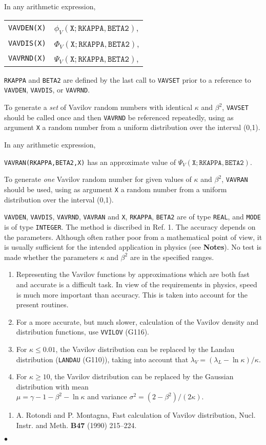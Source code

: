 In any arithmetic expression,
\begin{center}
\begin{tabular}{r@{\qquad has an approximate value of \qquad}l}
{\tt VAVDEN(X)} & $\phi_V(\mathtt{X;RKAPPA,BETA2})$, \\
{\tt VAVDIS(X)} & $\Phi_V(\mathtt{X;RKAPPA,BETA2})$, \\
{\tt VAVRND(X)} & $\Psi_V(\mathtt{X;RKAPPA,BETA2})$,
\end{tabular} \end{center}
\par
{\tt RKAPPA} and {\tt BETA2} are defined by the last call to
{\tt VAVSET} prior to a reference to {\tt VAVDEN}, {\tt VAVDIS}, or
{\tt VAVRND}.
\par
To generate a {\it set} of Vavilov random numbers with identical $\kappa$
and $\beta^2$, {\tt VAVSET} should be called once and then {\tt VAVRND}
be referenced repeatedly, using as argument {\tt X} a random number
from a uniform distribution over the interval (0,1).
\par
In any arithmetic expression,
\begin{center}
{\tt VAVRAN(RKAPPA,BETA2,X)} \qquad has an approximate value of \qquad
$\Psi_V(\mathtt{X;RKAPPA,BETA2})$.
\end{center}
To generate {\it one} Vavilov random number for given values of $\kappa$
and $\beta^2$, {\tt VAVRAN} should be used, using as argument
{\tt X} a random number from a uniform distribution over the interval
(0,1).
\par
{\tt VAVDEN}, {\tt VAVDIS}, {\tt VAVRND}, {\tt VAVRAN}
and {\tt X}, {\tt RKAPPA}, {\tt BETA2} are of type
{\tt REAL}, and {\tt MODE} is of type {\tt INTEGER}.
\Method
The method is discribed in Ref. 1.
\Accuracy
The accuracy depends on the parameters. Although often rather poor
from a mathematical point of view, it is usually sufficient for
the intended application in physics (see {\bf Notes}).
\Restrict
No test is made whether the parameters $\kappa$ and $\beta^2$
are in the specified ranges.
\Notes
\begin{enumerate}
\item Representing the Vavilov functions by approximations which are
both fast and accurate is a difficult task. In view
of the requirements in physics, speed is much more important than
accuracy. This is taken into account for the present routines.
\item For a more accurate, but much slower, calculation of the
Vavilov density and distribution functions, use {\tt VVILOV} (G116).
\item For $\kappa \le 0.01$, the Vavilov distribution can be
replaced by the Landau distribution ({\tt LANDAU} (G110)),
taking into account that $\lambda_V=(\lambda_L-\ln \kappa)/\kappa$.
\item For $\kappa \ge 10$, the Vavilov distribution can be
replaced by the Gaussian distribution with mean \\
$\mu=\gamma -1-\beta^2-\ln \kappa$ and variance
$\sigma^2=(2-\beta^2)/(2\kappa)$.
\end{enumerate}
\Refer
\begin{enumerate}
\item A. Rotondi and P. Montagna, Fast calculation of Vavilov
distribution, Nucl. Instr. and Meth. {\bf B47} (1990) 215--224.
\end{enumerate}
$\bullet$
